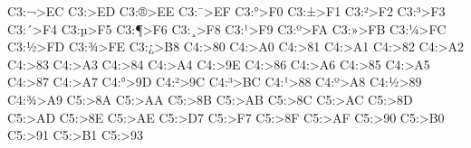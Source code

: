 \newutfenc C3:^^ac>EC%
\newutfenc C3:^^ad>ED%
\newutfenc C3:^^ae>EE%
\newutfenc C3:^^af>EF%
\newutfenc C3:^^b0>F0%
\newutfenc C3:^^b1>F1%
\newutfenc C3:^^b2>F2%
\newutfenc C3:^^b3>F3%
\newutfenc C3:^^b4>F4%
\newutfenc C3:^^b5>F5%
\newutfenc C3:^^b6>F6%
\newutfenc C3:^^b8>F8%
\newutfenc C3:^^b9>F9%
\newutfenc C3:^^ba>FA%
\newutfenc C3:^^bb>FB%
\newutfenc C3:^^bc>FC%
\newutfenc C3:^^bd>FD%
\newutfenc C3:^^be>FE%
\newutfenc C3:^^bf>B8%
\newutfenc C4:^^82>80%
\newutfenc C4:^^83>A0%
\newutfenc C4:^^84>81%
\newutfenc C4:^^85>A1%
\newutfenc C4:^^86>82%
\newutfenc C4:^^87>A2%
\newutfenc C4:^^8c>83%
\newutfenc C4:^^8d>A3%
\newutfenc C4:^^8e>84%
\newutfenc C4:^^8f>A4%
\newutfenc C4:^^91>9E%
\newutfenc C4:^^98>86%
\newutfenc C4:^^99>A6%
\newutfenc C4:^^9a>85%
\newutfenc C4:^^9b>A5%
\newutfenc C4:^^9e>87%
\newutfenc C4:^^9f>A7%
\newutfenc C4:^^b0>9D%
\newutfenc C4:^^b2>9C%
\newutfenc C4:^^b3>BC%
\newutfenc C4:^^b9>88%
\newutfenc C4:^^ba>A8%
\newutfenc C4:^^bd>89%
\newutfenc C4:^^be>A9%
\newutfenc C5:^^81>8A%
\newutfenc C5:^^82>AA%
\newutfenc C5:^^83>8B%
\newutfenc C5:^^84>AB%
\newutfenc C5:^^87>8C%
\newutfenc C5:^^88>AC%
\newutfenc C5:^^8a>8D%
\newutfenc C5:^^8b>AD%
\newutfenc C5:^^90>8E%
\newutfenc C5:^^91>AE%
\newutfenc C5:^^92>D7%
\newutfenc C5:^^93>F7%
\newutfenc C5:^^94>8F%
\newutfenc C5:^^95>AF%
\newutfenc C5:^^98>90%
\newutfenc C5:^^99>B0%
\newutfenc C5:^^9a>91%
\newutfenc C5:^^9b>B1%
\newutfenc C5:^^9e>93%
